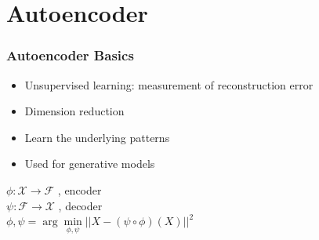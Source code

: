 \documentclass{beamer}
\begin{document}
\section{Autoencoder}
\begin{frame}
    \frametitle{Autoencoder Basics}
    \begin{itemize}
        \item Unsupervised learning: measurement of reconstruction error
        \item Dimension reduction
        \item Learn the underlying patterns
        \item Used for generative models
\end{itemize}
\begin{center}
    $ \phi : \mathcal{X} \rightarrow \mathcal{F}$ , encoder \\
    $ \psi : \mathcal{F} \rightarrow \mathcal{X}$ , decoder \\
    $ \phi,\psi = \arg \min\limits_{\phi,\psi} || X-(\psi \circ \phi)(X)||^2$
\end{center}
\begin{center}
    
\end{center}

\end{frame}

\end{document}
